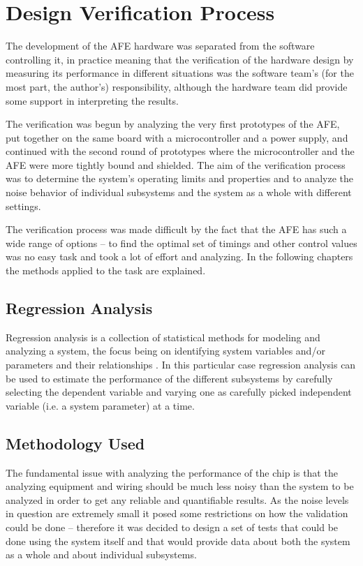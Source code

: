 \clearpage
\section{Design Verification Process}\label{section:prototype_validation}

The development of the AFE hardware was separated from the software controlling it, in practice meaning that the verification of the hardware design by measuring its performance in different situations was the software team's (for the most part, the author's) responsibility, although the hardware team did provide some support in interpreting the results.

The verification was begun by analyzing the very first prototypes of the AFE, put together on the same board with a microcontroller and a power supply, and continued with the second round of prototypes where the microcontroller and the AFE were more tightly bound and shielded. The aim of the verification process was to determine the system's operating limits and properties and to analyze the noise behavior of individual subsystems and the system as a whole with different settings.

The verification process was made difficult by the fact that the AFE has such a wide range of options -- to find the optimal set of timings and other control values was no easy task and took a lot of effort and analyzing. In the following chapters the methods applied to the task are explained.

\subsection{Regression Analysis}

Regression analysis is a collection of statistical methods for modeling and analyzing a system, the focus being on identifying system variables and/or parameters and their relationships \cite{Kleinbaum2007}. In this particular case regression analysis can be used to estimate the performance of the different subsystems by carefully selecting the dependent variable and varying one as carefully picked independent variable (i.e. a system parameter) at a time.

\subsection{Methodology Used}

The fundamental issue with analyzing the performance of the chip is that the analyzing equipment and wiring should be much less noisy than the system to be analyzed in order to get any reliable and quantifiable results. As the noise levels in question are extremely small it posed some restrictions on how the validation could be done -- therefore it was decided to design a set of tests that could be done using the system itself and that would provide data about both the system as a whole and about individual subsystems.

